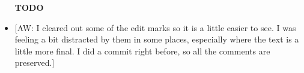 \newcommand{\aw}[1]{{\textcolor{armygreen}{[AW: #1]}}} %
\newcommand{\sarah}[1]{{\textcolor{amethyst}{[SF: #1]}}} %
\newcommand{\rs}[1]{{\textcolor{teal}{[RS: #1]}}} %
\newcommand{\rsedit}[2]{\sout{#1}{\color{teal}{#2}}}
\newcommand{\jo}[1]{{\textcolor{pauburn}{[JO: #1]}}} %
\newcommand{\jedit}[2]{\sout{#1}{\color{pauburn}{#2}}}
\newcommand{\cn}[1]{{\textcolor{blue}{[CN: #1]}}} %

\begin{itemize}
\item [\textbf{TODO}]
    \item \aw{I cleared out some of the edit marks so it is a little easier to see. I was feeling a bit distracted by them in some places, especially where the text is a little more final. I did a commit right before, so all the comments are preserved.}


\end{itemize}
